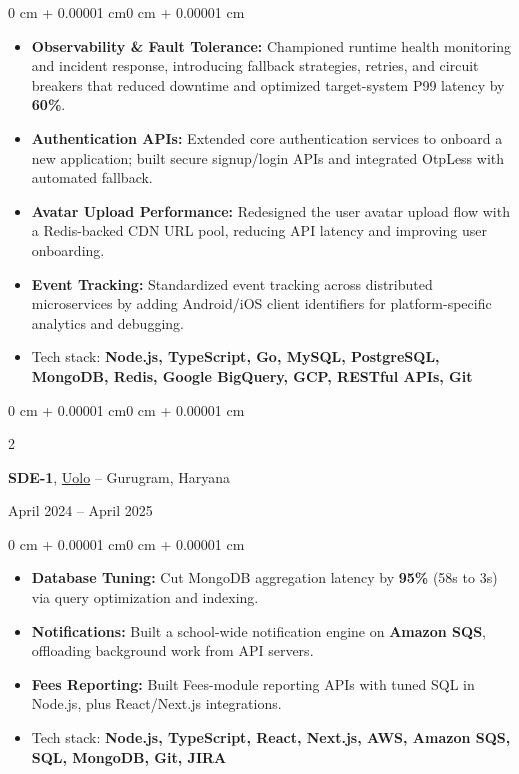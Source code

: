 \documentclass[11pt, letterpaper]{extarticle}
\newenvironment{highlights}{
    \begin{itemize}[
        topsep=0.01 cm,
        parsep=0pt,
        partopsep=0pt,
        itemsep=0pt,
        leftmargin=0 cm + 10pt
    ]
}{
    \end{itemize}
}
\newenvironment{onecolentry}{
    \begin{adjustwidth}{0 cm + 0.00001 cm}{0 cm + 0.00001 cm}
}{
    \end{adjustwidth}
}
\newenvironment{twocolentry}[2][]{
    \onecolentry
    \def\secondColumn{#2}
    \setcolumnwidth{\fill, 4.5 cm}
    \begin{paracol}{2}
}{
    \switchcolumn \raggedleft \secondColumn
    \end{paracol}
    \endonecolentry
}
\begin{document}
\begin{onecolentry}
\begin{highlights}
            \item \textbf{Observability \& Fault Tolerance:} Championed runtime health monitoring and incident response, introducing fallback strategies, retries, and circuit breakers that reduced downtime and optimized target-system P99 latency by \textbf{60\%}.
            \item \textbf{Authentication APIs:} Extended core authentication services to onboard a new application; built secure signup/login APIs and integrated OtpLess with automated fallback.
            \item \textbf{Avatar Upload Performance:} Redesigned the user avatar upload flow with a Redis-backed CDN URL pool, reducing API latency and improving user onboarding.
            \item \textbf{Event Tracking:} Standardized event tracking across distributed microservices by adding Android/iOS client identifiers for platform-specific analytics and debugging.
            \item {Tech stack: \textbf{Node.js, TypeScript, Go, MySQL, PostgreSQL, MongoDB, Redis, Google BigQuery, GCP, RESTful APIs, Git}}
        \end{highlights}
    \end{onecolentry}
    
    \vspace{0.05 cm}

    \begin{twocolentry}{April 2024 – April 2025}
    \textbf{SDE-1}, \href{https://www.linkedin.com/company/uolo/}{Uolo} -- Gurugram, Haryana
    \end{twocolentry}
    \vspace{0.05 cm}
    \begin{onecolentry}
        \begin{highlights}
            \item \textbf{Database Tuning:} Cut MongoDB aggregation latency by \textbf{95\%} (58s to 3s) via query optimization and indexing.
            \item \textbf{Notifications:} Built a school-wide notification engine on \textbf{Amazon SQS}, offloading background work from API servers.
            \item \textbf{Fees Reporting:} Built Fees-module reporting APIs with tuned SQL in Node.js, plus React/Next.js integrations.
            \item {Tech stack: \textbf{Node.js, TypeScript, React, Next.js, AWS, Amazon SQS, SQL, MongoDB, Git, JIRA}}
        \end{highlights}
    \end{onecolentry}
\end{document}
